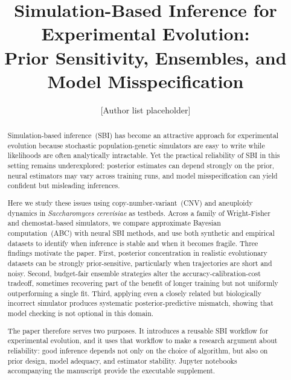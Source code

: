 \documentclass[11pt]{article}
\begin{document}
\title{\textbf{Simulation-Based Inference for Experimental Evolution:\\
Prior Sensitivity, Ensembles, and Model Misspecification}}

\author{[Author list placeholder]}

\date{}
\maketitle

\begin{abstract}
Simulation-based inference~(SBI) has become an attractive approach for
experimental evolution because stochastic population-genetic simulators are
easy to write while likelihoods are often analytically intractable.
Yet the practical reliability of SBI in this setting remains underexplored:
posterior estimates can depend strongly on the prior, neural estimators may
vary across training runs, and model misspecification can yield confident but
misleading inferences.

Here we study these issues using copy-number-variant~(CNV) and aneuploidy
dynamics in \emph{Saccharomyces cerevisiae} as testbeds.
Across a family of Wright-Fisher and chemostat-based simulators, we compare
approximate Bayesian computation~(ABC) with neural SBI methods, and use both
synthetic and empirical datasets to identify when inference is stable and
when it becomes fragile.
Three findings motivate the paper.
First, posterior concentration in realistic evolutionary datasets can be
strongly prior-sensitive, particularly when trajectories are short and noisy.
Second, budget-fair ensemble strategies alter the
accuracy-calibration-cost tradeoff, sometimes recovering part of the benefit
of longer training but not uniformly outperforming a single fit.
Third, applying even a closely related but biologically incorrect simulator
produces systematic posterior-predictive mismatch, showing that model
checking is not optional in this domain.

The paper therefore serves two purposes.
It introduces a reusable SBI workflow for experimental evolution, and it
uses that workflow to make a research argument about reliability:
good inference depends not only on the choice of algorithm, but also on
prior design, model adequacy, and estimator stability.
Jupyter notebooks accompanying the manuscript provide the executable
supplement.
\end{abstract}

\tableofcontents
\end{document}
